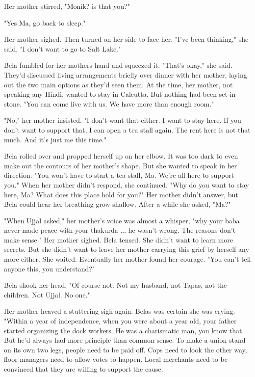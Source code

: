 \documentclass{amsart}
\begin{document}
Her mother stirred, "Monik? is that you?"

"Yes Ma, go back to sleep." 

Her mother sighed. Then turned on her side to face her. "I've been thinking," she said, "I don't want to go to Salt Lake." 

Bela fumbled for her mothers hand and squeezed it. "That's okay," she said. They'd discussed living arrangements briefly over dinner with her mother, laying out the two main options as they'd seen them. At the time, her mother, not speaking any Hindi, wanted to stay in Calcutta. But nothing had been set in stone. "You can come live with us. We have more than enough room."

"No," her mother insisted. "I don't want that either. I want to stay here. If you don't want to support that, I can open a tea stall again. The rent here is not that much. And it's just me this time." 

Bela rolled over and propped herself up on her elbow. It was too dark to even make out the contours of her mother's shape. But she wanted to speak in her direction. "You won't have to start a tea stall, Ma. We're all here to support you." When her mother didn't respond, she continued. "Why do you want to stay here, Ma? What does this place hold for you?" Her mother didn't answer, but Bela could hear her breathing grow shallow. After a while she asked, "Ma?"

"When Ujjal asked," her mother's voice was almost a whisper, "why your baba never made peace with your thakurda ... he wasn't wrong. The reasons don't make sense." Her mother sighed. Bela tensed. She didn't want to learn more secrets. But she didn't want to leave her mother carrying this grief by herself any more either. She waited. Eventually her mother found her courage. "You can't tell anyone this, you understand?" 

Bela shook her head. "Of course not. Not my husband, not Tapas, not the children. Not Ujjal. No one." 

Her mother heaved a stuttering sigh again. Belas was certain she was crying. "Within a year of independence, when you were about a year old, your father started organizing the dock workers. He was a charismatic man, you know that. But he'd always had more principle than common sense. To make a union stand on its own two legs, people need to be paid off. Cops need to look the other way, floor managers need to allow votes to happen. Local merchants need to be convinced that they are willing to support the cause.
\end{document}
